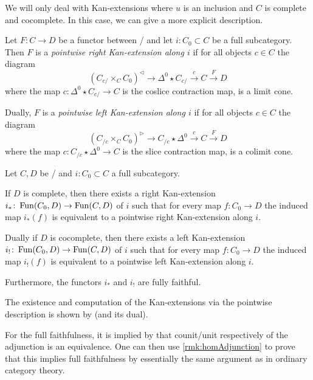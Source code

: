 We will only deal with Kan-extensions where $u$ is an inclusion and $C$ is complete and cocomplete.
In this case, we can give a more explicit description.
\begin{definition} %
    Let $F\colon C\to D$ be a functor between \inftycats/ and let $i\colon C_0\subset C$ be a full subcategory.
    Then $F$ is a \emph{pointwise right Kan-extension along $i$} if for all objects $c\in C$ the diagram
    \begin{equation*}
        \left(C_{c/}\times_C C_0\right)^{\lhd}\to \Delta^0\star C_{c/}\xrightarrow{c} C\xrightarrow{F} D
    \end{equation*}
    where the map $c\colon\Delta^0\star C_{c/}\to C$ is the coslice contraction map, is a limit cone.

    Dually, $F$ is a \emph{pointwise left Kan-extension along $i$} if for all objects $c\in C$ the diagram
    \begin{equation*}
        \left(C_{/c}\times_C C_0\right)^{\rhd}\to C_{/c}\star\Delta^0 \xrightarrow{c} C\xrightarrow{F} D
    \end{equation*}
    where the map $c\colon C_{/c}\star\Delta^0\to C$ is the slice contraction map, is a colimit cone.
\end{definition}
\begin{prop}\label{prop:exKanExt}
    Let $C,D$ be \inftycats/ and $i\colon C_0\subset C$ a full subcategory.
    
    If $D$ is complete, then there exists a right Kan-extension $i_*\colon\operatorname{Fun}(C_0,D)\to\operatorname{Fun}(C,D)$ of $i$ such that for every map $f\colon C_0\to D$ the induced map $i_*(f)$ is equivalent to a pointwise right Kan-extension along $i$.

    Dually if $D$ is cocomplete, then there exists a left Kan-extension $i_!\colon\operatorname{Fun}(C_0,D)\to\operatorname{Fun}(C,D)$ of $i$ such that for every map $f\colon C_0\to D$ the induced map $i_!(f)$ is equivalent to a pointwise left Kan-extension along $i$.

    Furthermore, the functors $i_*$ and $i_!$ are fully faithful.
    \begin{reference}
        The existence and computation of the Kan-extensions via the pointwise description is shown by \cite[Proposition 6.4.9]{cisinski_2019} (and its dual).
        
        For the full faithfulness, it is implied by \cite[Corollary 7.3.1.16]{kerodon} that counit/unit respectively of the adjunction is an equivalence.
        One can then use \cref{rmk:homAdjunction} to prove that this implies full faithfulness by essentially the same argument as in ordinary category theory.
    \end{reference}
\end{prop}
